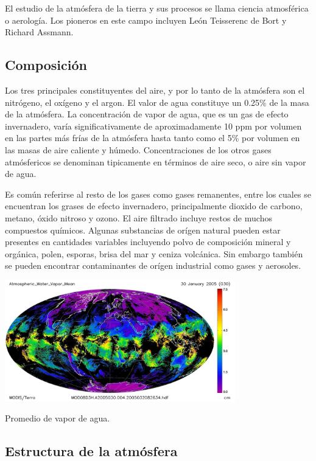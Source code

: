 \documentclass{article} %
\begin{document}
	El estudio de la atmósfera de la tierra y sus procesos se llama ciencia atmosférica o aerología. Los pioneros en este campo incluyen León Teisserenc de Bort y Richard Assmann.

\subsection{Composición}

	Los tres principales constituyentes del aire, y por lo tanto de la atmósfera son el nitrógeno, el oxígeno y el argon. El valor de agua constituye un 0.25\% de la masa de la atmósfera. La concentración de vapor de agua, que es un gas de efecto invernadero, varía significativamente de aproximadamente 10 ppm por volumen en las partes más frías de la atmósfera hasta tanto como el 5\% por volumen en las masas de aire caliente y húmedo. Concentraciones de los otros gases atmósfericos se denominan tipicamente en términos de aire seco, o aire sin vapor de agua. 
\vspace{0.5 cm}

	Es común referirse al resto de los gases como gases remanentes, entre los cuales se encuentran los grases de efecto invernadero, principalmente dioxido de carbono, metano, óxido nitroso y ozono. El aire filtrado incluye restos de muchos compuestos químicos. Algunas substancias de orígen natural pueden estar presentes en cantidades variables incluyendo polvo de composición mineral y orgánica, polen, esporas, brisa del mar y ceniza volcánica. Sin embargo también se pueden encontrar contaminantes de orígen industrial como gases y aerosoles.

\begin{center}

 	\includegraphics[width=10cm]{watervapor.jpg}
    
    Promedio de vapor de agua.
    
 \end{center}


\subsection{Estructura de la atmósfera}
\end{document}
